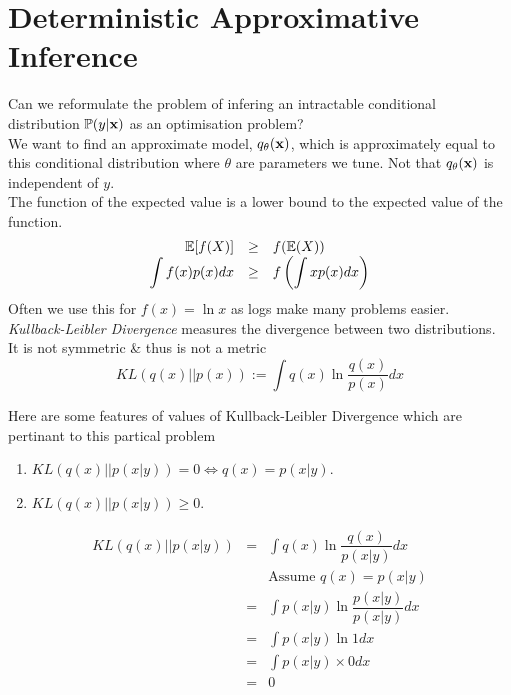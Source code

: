 \documentclass[11pt,a4paper]{article}
\begin{document}
\section{Deterministic Approximative Inference}

Can we reformulate the problem of infering an intractable conditional distribution $\mathbb{P}(y|\textbf{x})$ as an optimisation problem?\\
We want to find an approximate model, $q_\theta(\textbf{x})$, which is approximately equal to this conditional distribution where $\theta$ are parameters we tune. Not that $q_\theta(\textbf{x})$ is independent of $y$.\\

The function of the expected value is a lower bound to the expected value of the function.
\[\begin{array}{rcl}
\mathbb{E}[f(X)]&\geq&f(\mathbb{E}(X))\\
\displaystyle\int f(x)p(x)dx&\geq&f\left(\displaystyle\int xp(x)dx\right)
\end{array}\]
\nb Often we use this for $f(x)=\ln x$ as logs make many problems easier.\\

\textit{Kullback-Leibler Divergence} measures the divergence between two distributions.\\
It is not symmetric \& thus is not a metric
$$KL(q(x)||p(x)):=\int q(x)\ln\dfrac{q(x)}{p(x)}dx$$

Here are some features of values of Kullback-Leibler Divergence which are pertinant to this partical problem
\begin{enumerate}
	\item $KL(q(x)||p(x|y))=0\Longleftrightarrow q(x)=p(x|y)$.
	\item $KL(q(x)||p(x|y))\geq0$.
\end{enumerate}

\[\begin{array}{rcl}
KL(q(x)||p(x|y))&=&\displaystyle\int q(x)\ln\dfrac{q(x)}{p(x|y)}dx\\
&&\text{Assume\ }q(x)=p(x|y)\\
&=&\displaystyle\int p(x|y)\ln\dfrac{p(x|y)}{p(x|y)}dx\\
&=&\displaystyle\int p(x|y)\ln1dx\\
&=&\displaystyle\int p(x|y)\times0dx\\
&=&0
\end{array}\]
\end{document}
